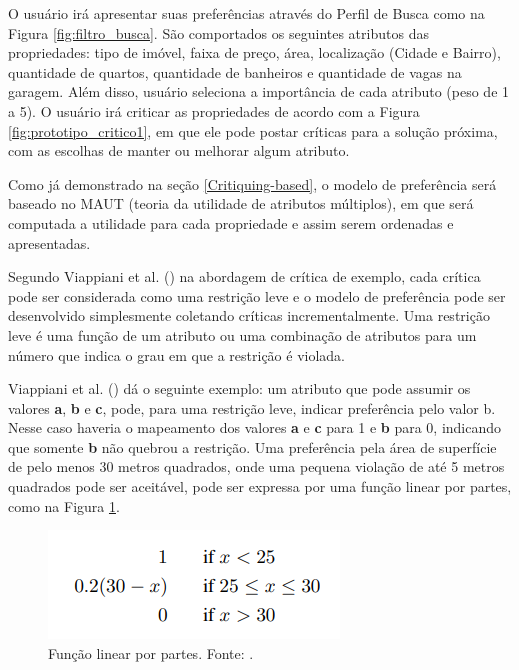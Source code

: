O usuário irá apresentar suas preferências através do Perfil de Busca como na Figura \ref{fig:filtro_busca}. São comportados os seguintes atributos das propriedades: tipo de imóvel, faixa de preço, área, localização (Cidade e Bairro), quantidade de quartos, quantidade de banheiros e quantidade de vagas na garagem. Além disso, usuário seleciona a importância de cada atributo (peso de 1 a 5). O usuário irá criticar as propriedades de acordo com a Figura \ref{fig:prototipo_critico1}, em que ele pode postar críticas para a solução próxima, com as escolhas de manter ou melhorar algum atributo.

Como já demonstrado na seção \ref{Critiquing-based}, o modelo de preferência será baseado no MAUT (teoria da utilidade de atributos múltiplos), em que será computada a utilidade para cada propriedade e assim serem ordenadas e apresentadas.

Segundo Viappiani et al. (\citeyear{Viappiani}) na abordagem de crítica de exemplo, cada crítica pode ser considerada como uma restrição leve e o modelo de preferência pode ser desenvolvido simplesmente coletando críticas incrementalmente. Uma restrição leve é uma função de um atributo ou uma combinação de atributos para um número que indica o grau em que a restrição é violada.

Viappiani et al. (\citeyear{Viappiani}) dá o seguinte exemplo: um atributo que pode assumir os valores \textbf{a}, \textbf{b} e \textbf{c}, pode, para uma restrição leve, indicar preferência pelo valor b. Nesse caso haveria o mapeamento dos valores \textbf{a} e \textbf{c} para 1 e \textbf{b} para 0, indicando que somente \textbf{b} não quebrou a restrição. Uma preferência pela área de superfície de pelo menos 30 metros quadrados, onde uma pequena violação de até 5 metros quadrados pode ser aceitável, pode ser expressa por uma função linear por partes, como na Figura \ref{fig:funcao_linear}.

\begin{figure}[H]
    \centering
    \includegraphics[scale=0.8]{figuras/proposta/funcao_linear.png}
    \caption[Função linear por partes]{Função linear por partes. Fonte: \cite{Viappiani}.}
    \label{fig:funcao_linear}
\end{figure}

